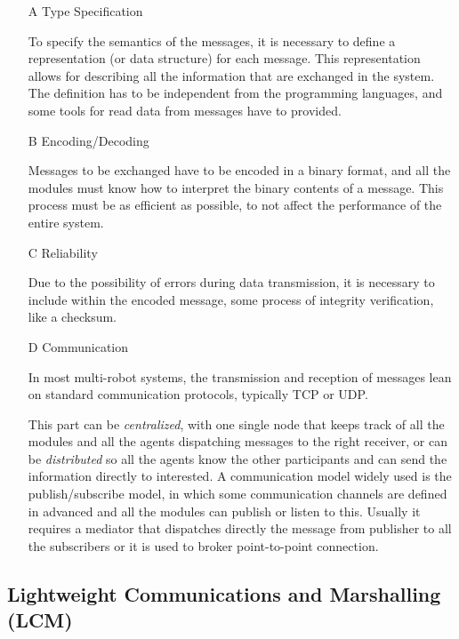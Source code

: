 \begin{itemize}
	
	\item[A] Type Specification
	
	To specify the semantics of the messages, it is necessary to define a representation (or data structure) for each message.
	This representation allows for describing all the information that are exchanged in the system.
    The definition has to be independent from the programming languages, and some tools for read data from messages have to provided.
	
	\item[B] Encoding/Decoding
	
	Messages to be exchanged have to be encoded in a binary format, and all the modules must know how to interpret the binary contents of a message. This process must be as efficient as possible, to not affect the performance of the entire system. 
	
	
	\item[C] Reliability
	
	Due to the possibility of errors during data transmission, it is necessary to include within the encoded message, some process of integrity verification, like a checksum.
	
	\item[D] Communication

	In most multi-robot systems, the transmission and reception of messages lean on standard communication protocols, typically TCP or UDP. 
	
	This part can be \emph{centralized}, with one single node that keeps track of all the modules and all the agents dispatching messages to the right receiver, or can be \emph{distributed} so all the agents know the other participants and can send the information directly to interested. 
	A communication model widely used is the publish/subscribe model, in which some communication channels are defined in advanced  and all the modules can publish or listen to this. Usually it requires a mediator that dispatches directly the message from publisher to all the subscribers or it is used to broker point-to-point connection.

\end{itemize}


\subsection{Lightweight Communications and Marshalling (LCM)}

